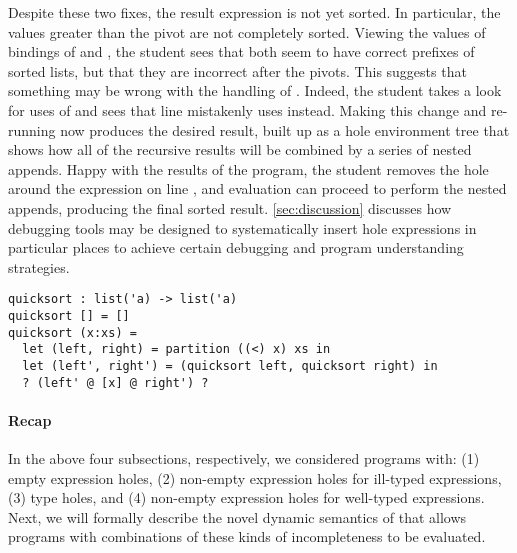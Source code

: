 Despite these two fixes, the result expression is not yet sorted.
%
In particular, the values greater than the pivot  are not completely
sorted.
%
Viewing the values of bindings of  and , the student sees
that both seem to have correct prefixes of sorted lists, but that they are
incorrect after the pivots.
%
This suggests that something may be wrong with the handling of .
%
Indeed, the student takes a look for uses of  and sees that line
 mistakenly uses  instead.
%
Making this change and re-running now produces the desired result, built up as a
hole environment tree that shows how all of the recursive results will be
combined by a series of nested appends.
%
Happy with the results of the program, the student removes the hole around the
expression on line , and evaluation can proceed to perform the nested
appends, producing the final sorted result.
%
\autoref{sec:discussion} discusses how debugging tools may be designed to
systematically insert hole expressions in particular places to achieve certain
debugging and program understanding strategies.
%
%

\begin{lstlisting}
quicksort : list('a) -> list('a)
quicksort [] = []
quicksort (x:xs) =
  let (left, right) = partition ((<) x) xs in
  let (left', right') = (quicksort left, quicksort right) in
  ? (left' @ [x] @ right') ?
\end{lstlisting}


\paragraph{Recap}
%
In the above four subsections, respectively, we considered programs with:
%
(1) empty expression holes,
%
(2) non-empty expression holes for ill-typed expressions,
%
(3) type holes, and
%
(4) non-empty expression holes for well-typed expressions.
%
Next, we will formally describe the novel dynamic semantics of \HazelnutLive{}
that allows programs with combinations of these kinds of incompleteness to be
evaluated.

